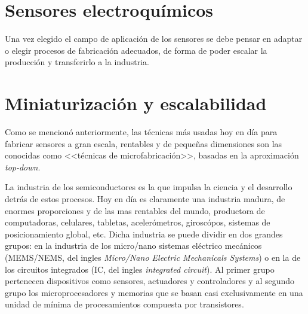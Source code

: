\section{Sensores electroquímicos}
		

			
		Una vez elegido el campo de aplicación de los sensores se debe pensar en adaptar o elegir procesos de fabricación adecuados, de forma de poder escalar la producción y transferirlo a la industria.

\section{Miniaturización y escalabilidad}\label{sec:microfabricacion}\label{sec:intro_fotolito}
		

		Como se mencionó anteriormente, las técnicas más usadas hoy en día para fabricar sensores a gran escala, rentables y de pequeñas dimensiones son las conocidas como <<técnicas de microfabricación>>, basadas en la aproximación \textit{top-down}. 

		La industria de los semiconductores es la que impulsa la ciencia y el desarrollo detrás de estos procesos. Hoy en día es claramente una industria madura, de enormes proporciones y de las mas rentables del mundo, productora de computadoras, celulares, tabletas, acelerómetros, giroscópos, sistemas de posicionamiento global, etc. Dicha industria se puede dividir en dos grandes grupos: en la industria de los micro/nano sistemas eléctrico mecánicos (MEMS/NEMS, del ingles \textit{Micro/Nano Electric Mechanicals Systems}) o en la de los circuitos integrados (IC, del ingles \textit{integrated circuit}). Al primer grupo pertenecen dispositivos como sensores, actuadores y controladores y al segundo grupo los microprocesadores y memorias que se basan casi exclusivamente en una unidad de mínima de procesamientos compuesta por transistores.

